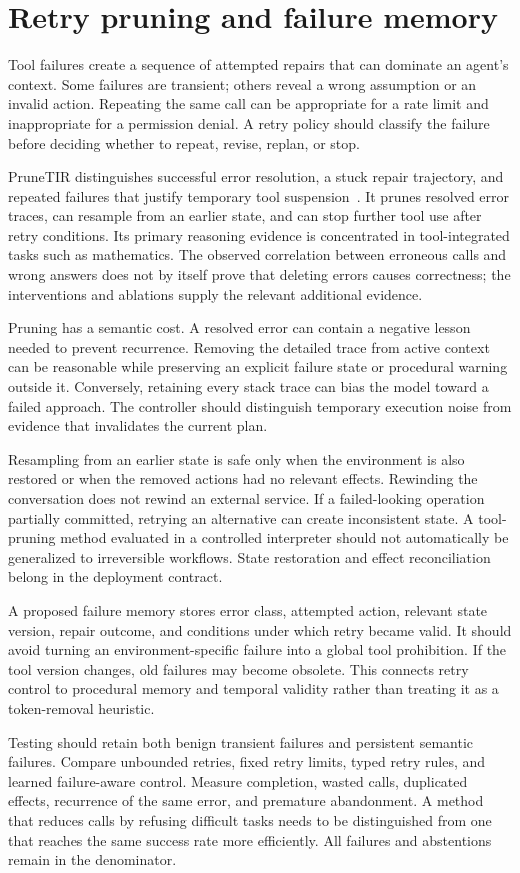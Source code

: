 \section{Retry pruning and failure memory}\label{sec:C18:pruning}
Tool failures create a sequence of attempted repairs that can dominate an agent's context. Some failures are transient; others reveal a wrong assumption or an invalid action. Repeating the same call can be appropriate for a rate limit and inappropriate for a permission denial. A retry policy should classify the failure before deciding whether to repeat, revise, replan, or stop.

PruneTIR distinguishes successful error resolution, a stuck repair trajectory, and repeated failures that justify temporary tool suspension~\cite{zhang2026prunetir}. It prunes resolved error traces, can resample from an earlier state, and can stop further tool use after retry conditions. Its primary reasoning evidence is concentrated in tool-integrated tasks such as mathematics. The observed correlation between erroneous calls and wrong answers does not by itself prove that deleting errors causes correctness; the interventions and ablations supply the relevant additional evidence.

Pruning has a semantic cost. A resolved error can contain a negative lesson needed to prevent recurrence. Removing the detailed trace from active context can be reasonable while preserving an explicit failure state or procedural warning outside it. Conversely, retaining every stack trace can bias the model toward a failed approach. The controller should distinguish temporary execution noise from evidence that invalidates the current plan.

Resampling from an earlier state is safe only when the environment is also restored or when the removed actions had no relevant effects. Rewinding the conversation does not rewind an external service. If a failed-looking operation partially committed, retrying an alternative can create inconsistent state. A tool-pruning method evaluated in a controlled interpreter should not automatically be generalized to irreversible workflows. State restoration and effect reconciliation belong in the deployment contract.

A proposed failure memory stores error class, attempted action, relevant state version, repair outcome, and conditions under which retry became valid. It should avoid turning an environment-specific failure into a global tool prohibition. If the tool version changes, old failures may become obsolete. This connects retry control to procedural memory and temporal validity rather than treating it as a token-removal heuristic.

Testing should retain both benign transient failures and persistent semantic failures. Compare unbounded retries, fixed retry limits, typed retry rules, and learned failure-aware control. Measure completion, wasted calls, duplicated effects, recurrence of the same error, and premature abandonment. A method that reduces calls by refusing difficult tasks needs to be distinguished from one that reaches the same success rate more efficiently. All failures and abstentions remain in the denominator.

